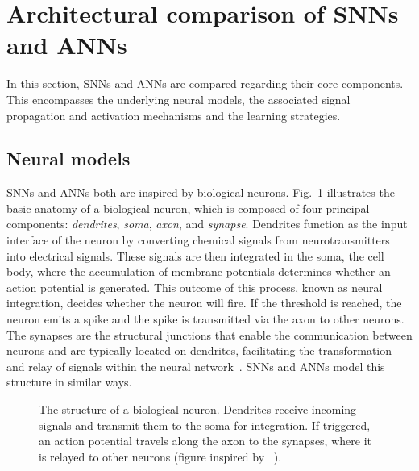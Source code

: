 \begin{table}
    \caption[Architectural differences between \acp{SNN} and \acp{ANN}]
    {Architectural differences between \acp{SNN} and \acp{ANN}.
    The two network types are compared by neural models, signal propagation and activation mechanisms, encoding schemas and learning paradigms.
    }
    \label{tab:archcomparison}
    \footnotesize
    {
    
    }
\end{table}


\section{Architectural comparison of \acp{SNN} and \acp{ANN}} \label{Sec:SNNsVsANNs}
In this section, \acp{SNN} and \acp{ANN} are compared regarding their core components.
This encompasses the underlying neural models, the associated signal propagation and activation mechanisms and the learning strategies.

\subsection{Neural models}\label{Subsec:NeuralModels}
\acp{SNN} and \acp{ANN} both are inspired by biological neurons.
Fig.~\ref{fig:bioneuron} illustrates the basic anatomy of a biological neuron, which is composed of four principal components: \textit{dendrites}, \textit{soma}, \textit{axon}, and \textit{synapse}.  
Dendrites function as the input interface of the neuron by converting chemical signals from neurotransmitters into electrical signals.  
These signals are then integrated in the soma, the cell body, where the accumulation of membrane potentials determines whether an action potential is generated.  
This outcome of this process, known as neural integration, decides whether the neuron will fire.  
If the threshold is reached, the neuron emits a spike and the spike is transmitted via the axon to other neurons.  
The synapses are the structural junctions that enable the communication between neurons and are typically located on dendrites, facilitating the transformation and relay of signals within the neural network~\cite{yamazaki_spiking_2022, pietrzak_overview_2023}.  
\acp{SNN} and \acp{ANN} model this structure in similar ways.
\begin{figure}
    \centering
    
    \caption[The structure of a biological neuron.]{The structure of a biological neuron.
    Dendrites receive incoming signals and transmit them to the soma for integration.
    If triggered, an action potential travels along the axon to the synapses, where it is relayed to other neurons (figure inspired by ~\cite{yamazaki_spiking_2022}).}
    \label{fig:bioneuron}
\end{figure}

